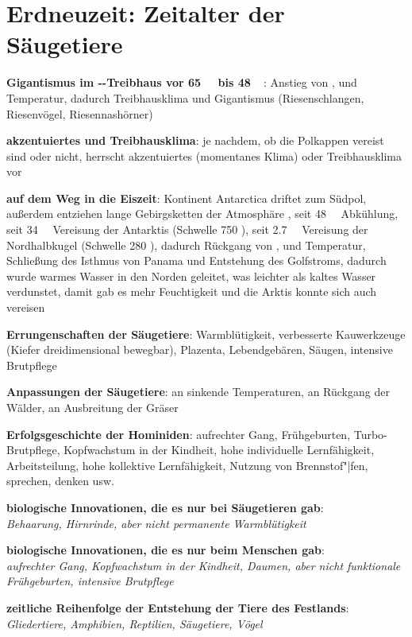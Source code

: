 \pagebreak

\section{%
    Erdneuzeit: Zeitalter der Säugetiere%
}

\textbf{Gigantismus im --Treibhaus vor \SI{65}{\mega\year} bis \SI{48}{\mega\year}}:
Anstieg von ,  und Temperatur,
dadurch Treibhausklima und Gigantismus
(Riesenschlangen, Riesenvögel, Riesennashörner)

\textbf{akzentuiertes und Treibhausklima}:
je nachdem, ob die Polkappen vereist sind oder nicht,
herrscht akzentuiertes (momentanes Klima) oder Treibhausklima vor

\textbf{auf dem Weg in die Eiszeit}:
Kontinent Antarctica driftet zum Südpol,
außerdem entziehen lange Gebirgsketten der Atmosphäre ,
seit \SI{48}{\mega\year} Abkühlung,
seit \SI{34}{\mega\year} Vereisung der Antarktis (Schwelle \SI{750}{\ppm} ),
seit \SI{2.7}{\mega\year} Vereisung der Nordhalbkugel (Schwelle \SI{280}{\ppm} ),
dadurch Rückgang von ,  und Temperatur,
Schließung des Isthmus von Panama und Entstehung des Golfstroms,
dadurch wurde warmes Wasser in den Norden geleitet, was leichter als kaltes Wasser verdunstet,
damit gab es mehr Feuchtigkeit und die Arktis konnte sich auch vereisen

\textbf{Errungenschaften der Säugetiere}:
Warmblütigkeit,
verbesserte Kauwerkzeuge (Kiefer dreidimensional bewegbar),
Plazenta,
Lebendgebären,
Säugen,
intensive Brutpflege

\textbf{Anpassungen der Säugetiere}:
an sinkende Temperaturen,
an Rückgang der Wälder,
an Ausbreitung der Gräser

\textbf{Erfolgsgeschichte der Hominiden}:
aufrechter Gang, Frühgeburten, Turbo-Brutpflege,
Kopfwachstum in der Kindheit, hohe individuelle Lernfähigkeit,
Arbeitsteilung, hohe kollektive Lernfähigkeit, Nutzung von Brennstof"|fen,
sprechen, denken usw.

\begin{wichtig}
    \item
    \textbf{biologische Innovationen, die es nur bei Säugetieren gab}:\\
    \emph{Behaarung, Hirnrinde, aber nicht permanente Warmblütigkeit}

    \item
    \textbf{biologische Innovationen, die es nur beim Menschen gab}:\\
    \emph{aufrechter Gang, Kopfwachstum in der Kindheit, Daumen,
    aber nicht funktionale Frühgeburten, intensive Brutpflege}

    \item
    \textbf{zeitliche Reihenfolge der Entstehung der Tiere des Festlands}:\\
    \emph{Gliedertiere, Amphibien, Reptilien, Säugetiere, Vögel}
\end{wichtig}


